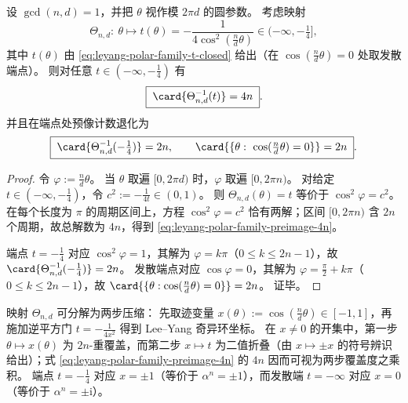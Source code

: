 

\begin{proposition}[推前覆盖度与退化预像计数]\label{prop:leyang-polar-family-preimage-count}
设 \(\gcd(n,d)=1\)，并把 \(\theta\) 视作模 \(2\pi d\) 的圆参数。
考虑映射
\[
\Theta_{n,d}:\ \theta\longmapsto t(\theta)=-\frac{1}{4\cos^2(\frac{n}{d}\theta)}\in(-\infty,-\tfrac14],
\]
其中 \(t(\theta)\) 由 \eqref{eq:leyang-polar-family-t-closed} 给出（在 \(\cos(\frac{n}{d}\theta)=0\) 处取发散端点）。
则对任意 \(t\in(-\infty,-\tfrac14)\) 有
\begin{equation}\label{eq:leyang-polar-family-preimage-4n}
\boxed{\;\card{\Theta_{n,d}^{-1}(t)}=4n\; }.
\end{equation}
并且在端点处预像计数退化为
\begin{equation}\label{eq:leyang-polar-family-preimage-endpoints}
\boxed{\;
\card{\Theta_{n,d}^{-1}(-\tfrac14)}=2n,\qquad
\card{\{\theta:\ \cos(\tfrac{n}{d}\theta)=0\}}=2n\; }.
\end{equation}
\end{proposition}
\begin{proof}
令 \(\varphi:=\frac{n}{d}\theta\)。
当 \(\theta\) 取遍 \([0,2\pi d)\) 时，\(\varphi\) 取遍 \([0,2\pi n)\)。
对给定 \(t\in(-\infty,-\tfrac14)\)，令 \(c^2:=-\frac{1}{4t}\in(0,1)\)。
则 \(\Theta_{n,d}(\theta)=t\) 等价于 \(\cos^2\varphi=c^2\)。
在每个长度为 \(\pi\) 的周期区间上，方程 \(\cos^2\varphi=c^2\) 恰有两解；区间 \([0,2\pi n)\) 含 \(2n\) 个周期，故总解数为 \(4n\)，得到 \eqref{eq:leyang-polar-family-preimage-4n}。
\par
端点 \(t=-\tfrac14\) 对应 \(\cos^2\varphi=1\)，其解为 \(\varphi=k\pi\)（\(0\le k\le 2n-1\)），故 \(\card{\Theta_{n,d}^{-1}(-\tfrac14)}=2n\)。
发散端点对应 \(\cos\varphi=0\)，其解为 \(\varphi=\frac{\pi}{2}+k\pi\)（\(0\le k\le 2n-1\)），故 \(\card{\{\theta:\cos(\tfrac{n}{d}\theta)=0\}}=2n\)。
证毕。
\end{proof}

\begin{remark}[双层分解与覆盖度解释]\label{rem:leyang-polar-family-two-layer-factorization}
映射 \(\Theta_{n,d}\) 可分解为两步压缩：
先取迹变量
\(
x(\theta):=\cos(\tfrac{n}{d}\theta)\in[-1,1]
\)，再施加逆平方门
\(
t=-\frac{1}{4x^2}
\)
得到 Lee--Yang 奇异环坐标。
在 \(x\neq 0\) 的开集中，第一步 \(\theta\mapsto x(\theta)\) 为 \(2n\)-重覆盖，而第二步 \(x\mapsto t\) 为二值折叠（由 \(x\mapsto \pm x\) 的符号辨识给出）；式 \eqref{eq:leyang-polar-family-preimage-4n} 的 \(4n\) 因而可视为两步覆盖度之乘积。
端点 \(t=-\tfrac14\) 对应 \(x=\pm 1\)（等价于 \(\alpha^n=\pm 1\)），而发散端 \(t=-\infty\) 对应 \(x=0\)（等价于 \(\alpha^n=\pm\mathrm{i}\)）。
\end{remark}

